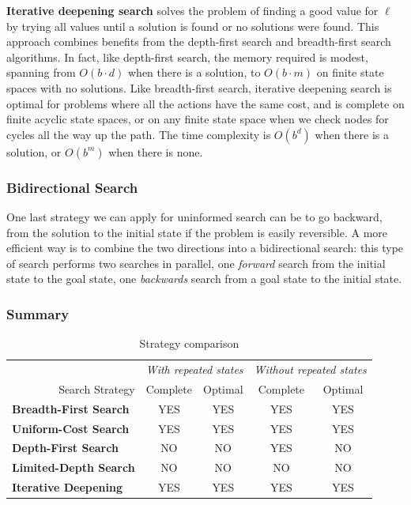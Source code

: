 \documentclass{article}
\begin{document}
\textbf{Iterative deepening search} solves the problem of finding a good value for \(\ell\) by trying all values until a solution is found or no solutions were found. This approach combines benefits from the depth-first search and breadth-first search algorithms. In fact, like depth-first search, the memory required is modest, spanning from \(O(b\cdot d)\) when there is a solution, to \(O(b\cdot m)\) on finite state spaces with no solutions. Like breadth-first search, iterative deepening search is optimal for problems where all the actions have the same cost, and is complete on finite acyclic state spaces, or on any finite state space when we check nodes for cycles all the way up the path. The time complexity is \(O(b^d)\) when there is a solution, or \(O(b^m)\) when there is none.

\subsubsection{Bidirectional Search}
One last strategy we can apply for uninformed search can be to go backward, from the solution to the initial state if the problem is easily reversible. A more efficient way is to combine the two directions into a bidirectional search: this type of search performs two searches in parallel, one \textit{forward} search from the initial state to the goal state, one \textit{backwards} search from a goal state to the initial state.

\subsubsection{Summary}

\begin{table}[h]
    \begin{tabular}{lcccc}
        \multicolumn{1}{l}{} & \multicolumn{2}{c}{\textit{With repeated states}} & \multicolumn{2}{c}{\textit{Without repeated states}} \\
        \multicolumn{1}{r||}{Search Strategy} & \multicolumn{1}{c|}{Complete} & \multicolumn{1}{c|}{Optimal} & \multicolumn{1}{c|}{Complete} & Optimal \\ \hline \hline
        \multicolumn{1}{l||}{\textbf{Breadth-First Search}} & \multicolumn{1}{c|}{YES} & \multicolumn{1}{c|}{YES} & \multicolumn{1}{c|}{YES} & YES \\ \hline
        \multicolumn{1}{l||}{\textbf{Uniform-Cost Search}} & \multicolumn{1}{c|}{YES} & \multicolumn{1}{c|}{YES} & \multicolumn{1}{c|}{YES} & YES \\ \hline
        \multicolumn{1}{l||}{\textbf{Depth-First Search}} & \multicolumn{1}{c|}{NO} & \multicolumn{1}{c|}{NO} & \multicolumn{1}{c|}{YES} & NO \\ \hline
        \multicolumn{1}{l||}{\textbf{Limited-Depth Search}} & \multicolumn{1}{c|}{NO} & \multicolumn{1}{c|}{NO} & \multicolumn{1}{c|}{NO} & NO \\ \hline
        \multicolumn{1}{l||}{\textbf{Iterative Deepening}} & \multicolumn{1}{c|}{YES} & \multicolumn{1}{c|}{YES} & \multicolumn{1}{c|}{YES} & YES
    \end{tabular}
    \caption{Strategy comparison}
    \label{tab:strategy_comparison}
\end{table}
\end{document}
